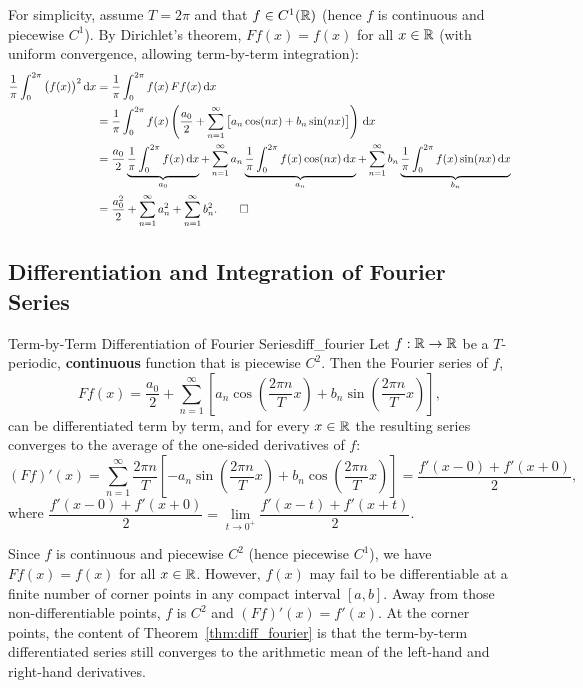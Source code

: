 \begin{demonstration}
    For simplicity, assume $T = 2\pi$ and that $f \in C^1(\mathbb{R})$ (hence $f$ is continuous and piecewise $C^1$). By Dirichlet's theorem, $Ff(x) = f(x)$ for all $x \in \mathbb{R}$ (with uniform convergence, allowing term-by-term integration):
    \begin{align*}
        \frac{1}{\pi} \int_{0}^{2\pi} \big(f(x)\big)^2 \,\mathrm{d}x &= \frac{1}{\pi} \int_{0}^{2\pi} f(x) \, Ff(x) \,\mathrm{d}x \\
        &= \frac{1}{\pi} \int_{0}^{2\pi} f(x) \left( \frac{a_0}{2} + \sum_{n=1}^{\infty} \big[ a_n \cos(nx) + b_n \sin(nx) \big] \right) \,\mathrm{d}x \\
        &= \frac{a_0}{2} \underbrace{\frac{1}{\pi} \int_{0}^{2\pi} f(x) \,\mathrm{d}x}_{a_0} + \sum_{n=1}^{\infty} a_n \underbrace{\frac{1}{\pi} \int_{0}^{2\pi} f(x) \cos(nx) \,\mathrm{d}x}_{a_n} + \sum_{n=1}^{\infty} b_n \underbrace{\frac{1}{\pi} \int_{0}^{2\pi} f(x) \sin(nx) \,\mathrm{d}x}_{b_n} \\
        &= \frac{a_0^2}{2} + \sum_{n=1}^{\infty} a_n^2 + \sum_{n=1}^{\infty} b_n^2. \qedhere
    \end{align*}
\end{demonstration}

\subsection{Differentiation and Integration of Fourier Series}

\begin{theoreme}{Term-by-Term Differentiation of Fourier Series}{diff_fourier}
    Let $f : \mathbb{R} \to \mathbb{R}$ be a $T$-periodic, \textbf{continuous} function that is piecewise $C^2$. Then the Fourier series of $f$,
    \[
        Ff(x) = \frac{a_0}{2} + \sum_{n=1}^{\infty} \left[ a_n \cos\left(\frac{2\pi n}{T} x\right) + b_n \sin\left(\frac{2\pi n}{T} x\right) \right],
    \]
    can be differentiated term by term, and for every $x \in \mathbb{R}$ the resulting series converges to the average of the one-sided derivatives of $f$:
    \[
        (Ff)'(x) = \sum_{n=1}^{\infty} \frac{2\pi n}{T} \left[ -a_n \sin\left(\frac{2\pi n}{T} x\right) + b_n \cos\left(\frac{2\pi n}{T} x\right) \right] = \frac{f'(x-0) + f'(x+0)}{2},
    \]
    where $\dfrac{f'(x-0) + f'(x+0)}{2} = \lim\limits_{t \to 0^+} \dfrac{f'(x-t) + f'(x+t)}{2}$.
\end{theoreme}

\begin{remarque}
    Since $f$ is continuous and piecewise $C^2$ (hence piecewise $C^1$), we have $Ff(x) = f(x)$ for all $x \in \mathbb{R}$. However, $f(x)$ may fail to be differentiable at a finite number of corner points in any compact interval $[a, b]$. Away from those non-differentiable points, $f$ is $C^2$ and $(Ff)'(x) = f'(x)$. At the corner points, the content of Theorem~\ref{thm:diff_fourier} is that the term-by-term differentiated series still converges to the arithmetic mean of the left-hand and right-hand derivatives.
\end{remarque}

